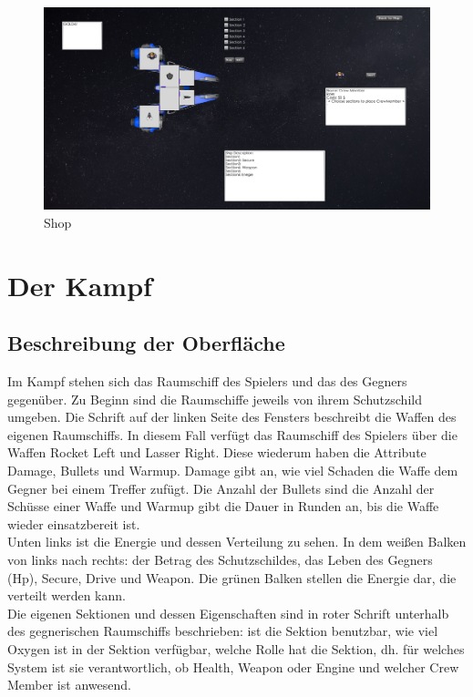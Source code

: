\documentclass[fontsize=12pt,paper=a4,twoside]{scrartcl}
\begin{document}
\begin{figure}[htp]
	\centering
	\includegraphics[width=1.00\linewidth]{pics/shopScreen.png} %
	\caption{Shop}
	\label{fig1}
\end{figure}

\section{Der Kampf}

\subsection{Beschreibung der Oberfläche}
Im Kampf stehen sich das Raumschiff des Spielers und das des Gegners gegenüber.
Zu Beginn sind die Raumschiffe jeweils von ihrem Schutzschild umgeben.
Die Schrift auf der linken Seite des Fensters beschreibt die Waffen des eigenen Raumschiffs.
In diesem Fall verfügt das Raumschiff des Spielers über die Waffen Rocket Left und Lasser Right.
Diese wiederum haben die Attribute Damage, Bullets und Warmup. Damage gibt an, wie viel Schaden die Waffe dem Gegner bei einem Treffer zufügt. Die Anzahl der Bullets sind
die Anzahl der Schüsse einer Waffe und Warmup gibt die Dauer in Runden an, bis die Waffe wieder einsatzbereit ist.\\

Unten links ist die Energie und dessen Verteilung zu sehen. In dem weißen Balken von links nach rechts: der Betrag des Schutzschildes, das Leben des Gegners (Hp), Secure, Drive und Weapon.
Die grünen Balken stellen die Energie dar, die verteilt werden kann.\\

Die eigenen Sektionen und dessen Eigenschaften sind in roter Schrift unterhalb des gegnerischen Raumschiffs beschrieben: ist die Sektion benutzbar, wie viel Oxygen ist in der Sektion verfügbar, welche Rolle hat die Sektion, dh. für welches System ist sie verantwortlich, ob Health, Weapon oder Engine und welcher Crew Member ist anwesend.\\
\end{document}
